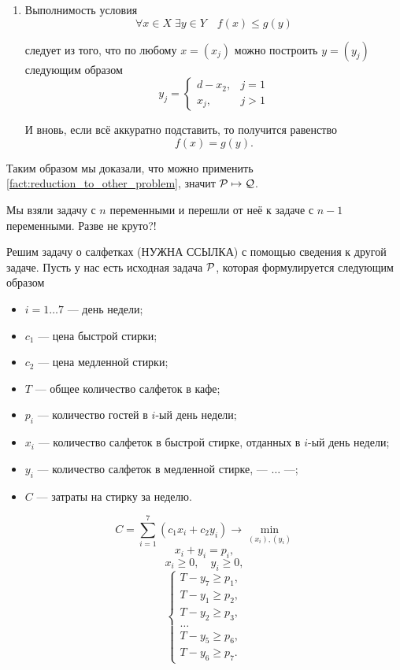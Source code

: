 \begin{enumerate}[nosep]
\begin{enumerate}
			\item Выполнимость условия
			\[
				\forall x \in X \; \exists y \in Y \quad f(x) \le g(y)
			\]
			
			следует из того, что по любому $x = (x_j)$ можно построить $y = (y_j)$ следующим образом
			\[
				y_j = \begin{cases}
					d - x_2,& j = 1 \\
					x_j,& j > 1
				\end{cases}
			\]
		
			И вновь, если всё аккуратно подставить, то получится равенство
			\[
				f(x) = g(y).
			\]
		\end{enumerate}
\end{enumerate}

Таким образом мы доказали, что можно применить \cref{fact:reduction_to_other_problem}, значит $\P \mapsto \Q$.

Мы взяли задачу с $n$ переменными и перешли от неё к задаче с $n-1$ переменными. Разве не круто?!


Решим задачу о салфетках (НУЖНА ССЫЛКА) с помощью сведения к другой задаче. Пусть у нас есть исходная задача $\P$, которая формулируется следующим образом

\begin{itemize}[nosep]
	\item $i = 1 \dots 7$ --- день недели;
	
	\item $c_1$ --- цена быстрой стирки;
	
	\item $c_2$ --- цена медленной стирки;
	
	\item $T$ --- общее количество салфеток в кафе;
	
	\item $p_i$ --- количество гостей в $i$-ый день недели;
	
	\item $x_i$ --- количество салфеток в быстрой стирке, отданных в $i$-ый день недели;
	
	\item $y_i$ --- количество салфеток в медленной стирке, --- $\dots$ ---;
	
	\item $C$ --- затраты на стирку за неделю.
\end{itemize}

\[
	C = \sum_{i=1}^7 (c_1 x_i + c_2 y_i) \to \min_{(x_i), (y_i)}
\]
\[
	x_i + y_i = p_i,
\]
\[
	x_i \ge 0, \quad y_i \ge 0,
\]
\[
	\begin{cases}
		T - y_7 \ge p_1, \\
		T - y_1 \ge p_2, \\
		T - y_2 \ge p_3, \\
		\dots \\
		T - y_5 \ge p_6, \\
		T - y_6 \ge p_7.
	\end{cases}
\]

